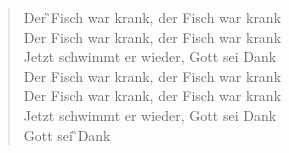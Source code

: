 \documentclass[9pt,a4paper,oneside, onecolumn]{article}
\begin{document}
\begin{multicols}{2}
\begin{verse}
Der \G{}Fisch war krank, der \Em{}Fisch war krank\\
Der \C{}Fisch war krank, der Fisch war krank\\
Jetzt schwimmt er wieder, Gott sei Dank\\
Der Fisch war krank, der Fisch war krank\\
Der Fisch war krank, der Fisch war krank\\
Jetzt schwimmt er wieder, Gott sei Dank\\

Gott sei \G{}Dank\\
\end{verse}
\end{multicols}
\end{document}
